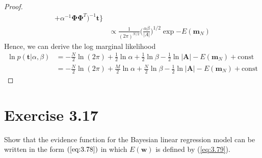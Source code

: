 \begin{proof}
\begin{align*}
                + \alpha^{-1}\mathbf{\Phi}\mathbf{\Phi}^T)^{-1}\mathbf{t}\bigg\} \\
        &\propto \frac{1}{(2\pi)^{N/2}} \bigg(\frac{\alpha\beta}{|A|}\bigg)^{1/2} 
            \exp{-E(\mathbf{m}_N)}
    \end{align*}
    Hence, we can derive the log marginal likelihood
    \begin{align*}
        \ln p(\mathbf{t} | \alpha, \beta)
        &= -\frac{N}{2} \ln(2\pi) + \frac{1}{2} \ln \alpha + \frac{1}{2} \ln \beta
            - \frac{1}{2} \ln |\mathbf{A}| - E(\mathbf{m}_N) + \text{const} \\
        &= -\frac{N}{2} \ln(2\pi) + \frac{M}{2} \ln \alpha + \frac{N}{2} \ln \beta
            - \frac{1}{2} \ln |\mathbf{A}| - E(\mathbf{m}_N) + \text{const}
    \end{align*}
\end{proof}

\section*{Exercise 3.17}
Show that the evidence function for the Bayesian linear regression
model can be written in the form $(\ref{eq:3.78})$ in which
$E(\mathbf{w})$ is defined by (\ref{eq:3.79}).

\vspace{1em}

